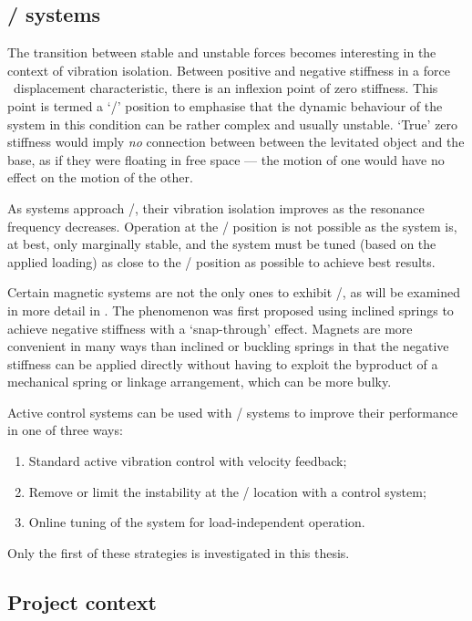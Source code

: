 \documentclass[11pt,a4paper]{memoir}
\begin{document}
\subsection{\QZS/ systems}

The transition between stable and unstable forces becomes interesting in the context of vibration isolation.
Between positive and negative stiffness in a force \vs\ displacement characteristic, there is an inflexion point of zero stiffness.
This point is termed a `\qzs/' position to emphasise that the dynamic behaviour of the system in this condition can be rather complex and usually unstable.
`True' zero stiffness would imply \emph{no} connection between between the levitated object and the base, as if they were floating in free space — the motion of one would have no effect on the motion of the other.

As systems approach \qzs/, their vibration isolation improves as the resonance frequency decreases.
Operation at the \qzs/ position is not possible as the system is, at best, only marginally stable, and the system must be tuned (based on the applied loading) as close to the \qzs/ position as possible to achieve best results.

Certain magnetic systems are not the only ones to exhibit \qzs/, as will be examined in more detail in .
The phenomenon was first proposed using inclined springs to achieve negative stiffness with a `snap-through' effect.
Magnets are more convenient in many ways than inclined or buckling springs in that the negative stiffness can be applied directly without having to exploit the byproduct of a mechanical spring or linkage arrangement, which can be more bulky.

Active control systems can be used with \qzs/ systems to improve their performance in one of three ways:
\begin{enumerate}
  \item Standard active vibration control with velocity feedback;
  \item Remove or limit the instability at the \qzs/ location with a control system;
  \item Online tuning of the system for load-independent operation.
\end{enumerate}
Only the first of these strategies is investigated in this thesis.


\subsection{Project context}
\end{document}
